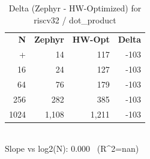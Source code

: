\begin{table}[tb]
    \centering
    \caption{Delta (Zephyr - HW-Optimized) for riscv32 / dot_product}
    \label{tab:delta_riscv32_dot_product}
    \scriptsize
    \begin{tabular}{r r r r}
        \hline
        \textbf{N} & \textbf{Zephyr} & \textbf{HW-Opt} & \textbf{Delta} \\\n+        \hline
        4 & 14 & 117 & -103\\
        16 & 24 & 127 & -103\\
        64 & 76 & 179 & -103\\
        256 & 282 & 385 & -103\\
        1024 & 1,108 & 1,211 & -103\\
        \hline
    \end{tabular}
    \vspace{2mm}\\\n    Slope vs log2(N): 0.000 \ (R^2=nan)\n\end{table}
